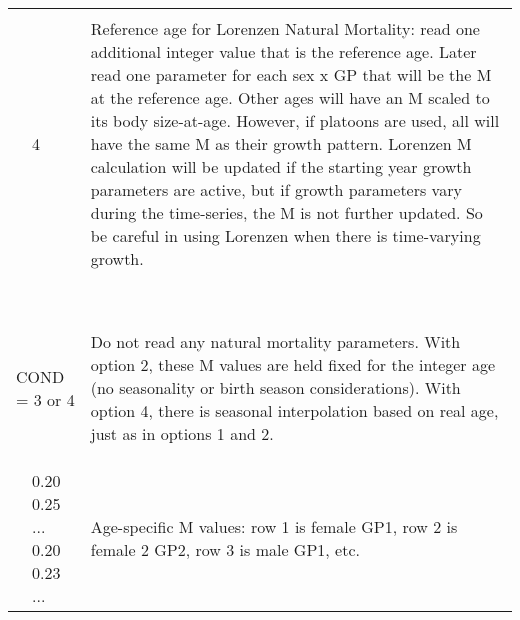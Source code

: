 \begin{longtable}{p{0.5cm} p{2cm} p{12.75cm}}
	   \pagebreak
	   \multicolumn{2}{l}{COND = 2}& \\
	   & 4 & \multirow{1}{12cm}[-0.1cm]{Reference age for Lorenzen Natural Mortality: read one additional integer value that is the reference age. Later read one parameter for each sex x GP that will be the M at the reference age.  Other ages will have an M scaled to its body size-at-age.  However, if platoons are used, all will have the same M as their growth pattern.  Lorenzen M calculation will be updated if the starting year growth parameters are active, but if growth parameters vary during the time-series, the M is not further updated.  So be careful in using Lorenzen when there is time-varying growth.}\\
	   \\
	   \\
	   \\
	   \\
	   \\
	   \\
	   \\
	   \\
	   \\
			\hline
	   \multicolumn{2}{l}{COND = 3 or 4} & \multirow{1}{12cm}[-0.1cm]{Do not read any natural mortality parameters.  With option 2, these M values are held fixed for the integer age (no seasonality or birth season considerations). With option 4, there is seasonal interpolation based on real age, just as in options 1 and 2.}\\
	   \\
	   \\
	   \\
	   & 0.20 0.25 ... 0.20 0.23 ... & \multirow{1}{12cm}[-0.1cm]{Age-specific M values: row 1 is female GP1, row 2 is female 2 GP2, row 3 is male GP1, etc.}\\
	   \hline
\end{longtable}

